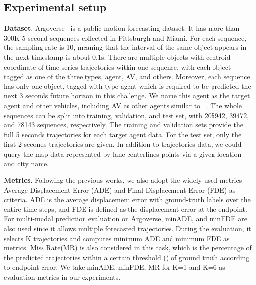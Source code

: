 \documentclass[final]{cvpr}
\begin{document}
\subsection{Experimental setup}
\textbf{Dataset}. Argoverse~\cite{chang2019argoverse} is a public motion forecasting dataset. It has more than 300K 5-second sequences collected in Pittsburgh and Miami. For each sequence, the sampling rate is 10, meaning that the interval of the same object appears in the next timestamp is about 0.1s. There are multiple objects with centroid coordinate of time series trajectories within one sequence, with each object tagged as one of the three types, agent, AV, and others. Moreover, each sequence has only one object, tagged with type agent which is required to be predicted the next 3 seconds future horizon in this challenge. We name this agent as the target agent and other vehicles, including AV as other agents similar to ~\cite{gao2020vectornet}. The whole sequences can be split into training, validation, and test set, with 205942, 39472, and 78143 sequences, respectively. The training and validation sets provide the full 5 seconds trajectories for each target agent data. For the test set, only the first 2 seconds trajectories are given. In addition to trajectories data, 
we could query the map data represented by lane centerlines points via a given location and city name.

\textbf{Metrics}. Following the previous works, we also adopt the widely used metrics Average Displacement Error (ADE) and Final Displacement Error (FDE) as criteria. 
ADE is the average displacement error with ground-truth labels over the entire time steps, and FDE is defined as the displacement error at the endpoint. 
For multi-modal prediction evaluation on Argoverse, minADE, and minFDE are also used since it allows multiple forecasted trajectories. During the evaluation, it selects K trajectories and computes minimum ADE and minimum FDE as metrics. Miss Rate(MR) is also considered in this task, which is the percentage of the predicted trajectories within a certain threshold () of ground truth according to endpoint error.
We take minADE, minFDE, MR for K=1 and K=6 as evaluation metrics in our experiments.
\end{document}

